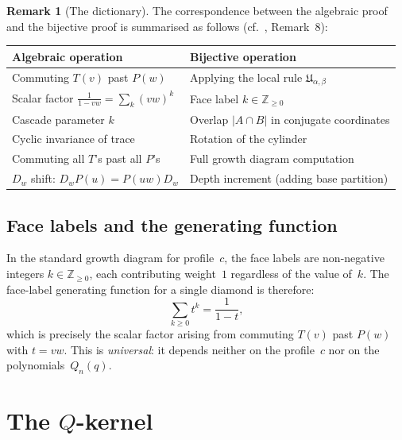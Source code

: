 \documentclass[11pt]{article}
\newcommand{\Z}{\mathbb{Z}}
\theoremstyle{plain}
\theoremstyle{definition}
\newtheorem{remark}[theorem]{Remark}
\begin{document}
\begin{remark}[The dictionary]
\label{rem:dictionary}
The correspondence between the algebraic proof and the bijective
proof is summarised as follows
(cf.~\cite{COMMUTATION}, Remark~8):
\begin{center}
\begin{tabular}{l|l}
\textbf{Algebraic operation} & \textbf{Bijective operation} \\
\hline
Commuting $T(v)$ past $P(w)$ &
  Applying the local rule $\mathfrak{U}_{\alpha,\beta}$ \\[3pt]
Scalar factor $\frac{1}{1-vw} = \sum_k (vw)^k$ &
  Face label $k \in \Z_{\geq 0}$ \\[3pt]
Cascade parameter $k$ &
  Overlap $|A \cap B|$ in conjugate coordinates \\[3pt]
Cyclic invariance of trace &
  Rotation of the cylinder \\[3pt]
Commuting all $T$'s past all $P$'s &
  Full growth diagram computation \\[3pt]
$D_w$ shift: $D_w P(u) = P(uw) D_w$ &
  Depth increment (adding base partition)
\end{tabular}
\end{center}
\end{remark}

\subsection{Face labels and the generating function}

In the standard growth diagram for profile~$c$, the face labels
are non-negative integers $k \in \Z_{\geq 0}$, each contributing
weight~$1$ regardless of the value of~$k$.  The face-label
generating function for a single diamond is therefore:
\begin{equation}\label{eq:face-gf-std}
  \sum_{k \geq 0} t^k = \frac{1}{1-t},
\end{equation}
which is precisely the scalar factor arising from commuting $T(v)$
past $P(w)$ with $t = vw$.  This is \emph{universal}: it depends
neither on the profile~$c$ nor on the polynomials~$Q_n(q)$.


\section{The $Q$-kernel}
\label{sec:Q-kernel}
\end{document}
